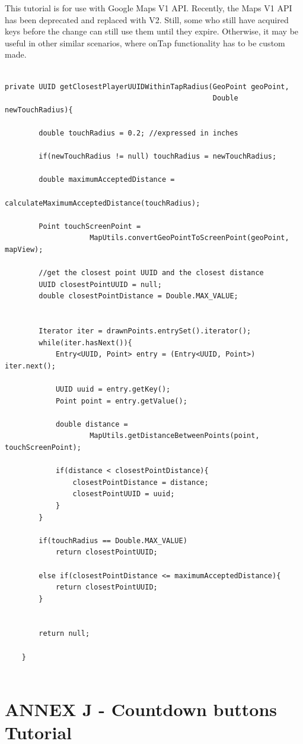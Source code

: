 \documentclass{article}
\begin{document}
This tutorial is for use with Google Maps V1 API. Recently, the Maps V1 API has
been deprecated and replaced with V2. Still, some who still have acquired keys
before the change can still use them until they expire. Otherwise, it
may be useful in other similar scenarios, where onTap functionality
has to be custom made.\newline
\begin{verbatim}

private UUID getClosestPlayerUUIDWithinTapRadius(GeoPoint geoPoint,
												 Double newTouchRadius){
		
		double touchRadius = 0.2; //expressed in inches
		
		if(newTouchRadius != null) touchRadius = newTouchRadius;		 
				
		double maximumAcceptedDistance = 
								calculateMaximumAcceptedDistance(touchRadius);
		
		Point touchScreenPoint = 
					MapUtils.convertGeoPointToScreenPoint(geoPoint, mapView);
		
		//get the closest point UUID and the closest distance
		UUID closestPointUUID = null;
		double closestPointDistance = Double.MAX_VALUE;
			
		
		Iterator iter = drawnPoints.entrySet().iterator();
		while(iter.hasNext()){			
			Entry<UUID, Point> entry = (Entry<UUID, Point>) iter.next();
			
			UUID uuid = entry.getKey();
			Point point = entry.getValue();
			
			double distance = 
					MapUtils.getDistanceBetweenPoints(point, touchScreenPoint);
			
			if(distance < closestPointDistance){
				closestPointDistance = distance;
				closestPointUUID = uuid;		
			}
		}
		
		if(touchRadius == Double.MAX_VALUE) 
			return closestPointUUID;
		
		else if(closestPointDistance <= maximumAcceptedDistance){
			return closestPointUUID;
		}
		
		
		return null;
		
	}
	
\end{verbatim}


\section{ANNEX J - Countdown buttons Tutorial}
\end{document}
